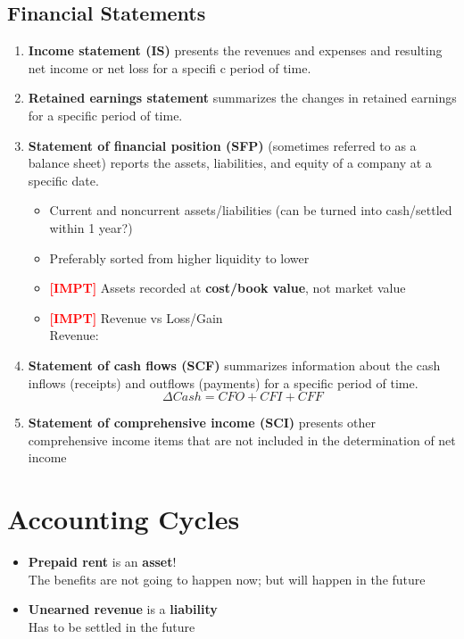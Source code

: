 \documentclass{article}
\newcommand{\impt}[0]{\textcolor{red}{\textbf{[IMPT] }}}
\begin{document}
\begin{multicols}{2}
\subsection{Financial Statements}
\begin{enumerate}
	\item \textbf{Income statement (IS)} presents the revenues and expenses and resulting net  income or net loss for a specifi c period of time.
	\item \textbf{Retained earnings statement} summarizes the changes in retained earnings for a specific period of time.
	\item \textbf{Statement of financial position (SFP)} (sometimes referred to as a balance sheet) reports the assets, liabilities, and equity of a company at a specific date.
	\begin{itemize}
		\item Current and noncurrent assets/liabilities (can be turned into cash/settled within 1 year?)
		\item Preferably sorted from higher liquidity to lower
		\item \impt Assets recorded at \textbf{cost/book value}, not market value
		\item \impt Revenue vs Loss/Gain\\
		Revenue:
	\end{itemize}
	\item \textbf{Statement of cash flows (SCF)} summarizes information about the cash inflows (receipts) and outflows (payments) for a specific period of time.
	$$\Delta Cash = CFO + CFI + CFF$$
	\item \textbf{Statement of comprehensive income (SCI)} presents other comprehensive income items that are not included in the determination of net income
\end{enumerate}

\section{Accounting Cycles}
\begin{itemize}
	\item \textbf{Prepaid rent} is an \textbf{asset}!\\
	The benefits are not going to happen now; but will happen in the future
	\item \textbf{Unearned revenue} is a \textbf{liability}\\
	Has to be settled in the future
\end{itemize}



\end{multicols}
\end{document}
